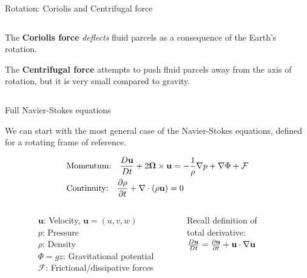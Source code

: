 \documentclass[aspectratio=169,xcolor=dvipsnames]{beamer}
\begin{document}
{\begin{frame}{Rotation: Coriolis and Centrifugal force}
\begin{columns}
\begin{column}{0.5\textwidth}
        \vspace{1.2em}
        
        The \textbf{Coriolis force} \emph{deflects} fluid
        parcels as a consequence of the
        Earth’s rotation.
        
        \vspace{1.2em}
        
        The \textbf{Centrifugal force} attempts to push fluid parcels away from the axis of rotation, but it is very small compared to gravity.
    \end{column}
\end{columns}
\end{frame}
} %

\begin{frame}{Full Navier-Stokes equations}

We can start with the most general case of the Navier-Stokes equations, defined for a rotating frame of reference.

\begin{align*}
&\text{Momentum:} \quad 
\frac{D\mathbf{u}}{Dt} + 2\boldsymbol{\Omega} \times \mathbf{u}
= -\frac{1}{\rho}\nabla p + \nabla \Phi + \mathcal{F}\\
&\text{Continuity:} \quad 
\pdv{\rho}{t} + \nabla \cdot (\rho \mathbf{u}) = 0 \\
\end{align*}

\begin{columns}
    \begin{column}{0.15\textwidth}
    \end{column}
    \begin{column}{0.4\textwidth}
        $\mathbf{u}$: Velocity, $\mathbf{u} = (u,v,w)$ \\
        $p$: Pressure \\
        $\rho$: Density \\
        $\Phi = gz$: Gravitational potential \\
        $\mathcal{F}$: Frictional/dissipative forces \\
    \end{column}
    \begin{column}{0.3\textwidth}
        \begin{block}{}
        \centering
        \small{Recall definition of \\ 
        total derivative:} \\
        \vspace{0.1cm}
        $\frac{D\boldsymbol{u}}{Dt} = \pdv{\mathbf{u}}{t} + \mathbf{u} \cdot \nabla \mathbf{u}$
        \end{block}
    \end{column}
    \begin{column}{0.15\textwidth}
    \end{column}
\end{columns}

\vspace{0.3cm}

\end{frame}
\end{document}
